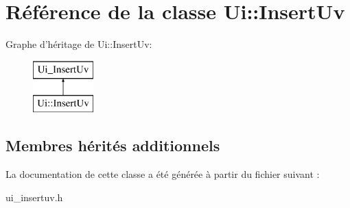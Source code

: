 \hypertarget{class_ui_1_1_insert_uv}{\section{Référence de la classe Ui\+:\+:Insert\+Uv}
\label{class_ui_1_1_insert_uv}
}
Graphe d'héritage de Ui\+:\+:Insert\+Uv\+:\begin{figure}[H]
\begin{center}
\leavevmode
\includegraphics[height=2.000000cm]{class_ui_1_1_insert_uv}
\end{center}
\end{figure}
\subsection*{Membres hérités additionnels}


La documentation de cette classe a été générée à partir du fichier suivant \+:\begin{DoxyCompactItemize}
\item 
ui\+\_\+insertuv.\+h\end{DoxyCompactItemize}
